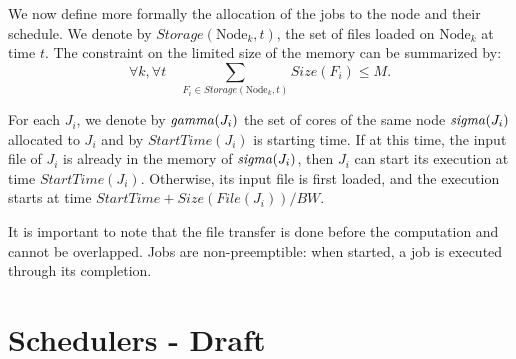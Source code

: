 \documentclass[conference,10pt]{IEEEtran}
\newcommand{\Node}[1]{\ensuremath{\mathrm{Node}_{#1}}\xspace}
\newcommand{\file}{\ensuremath{\mathit{File}}\xspace}
\newcommand{\storage}{\ensuremath{\mathit{Storage}}\xspace}
\newcommand{\size}{\ensuremath{\mathit{Size}}\xspace}
\newcommand{\bandwidth}{\mathit{BW}\xspace}
\newcommand{\walltime}{\mathit{WallTime}\xspace}
\newcommand{\start}{\mathit{StartTime}\xspace}
\newcommand{\allocatednode}{\ensuremath\mathit{sigma}\xspace}
\newcommand{\allocatedcores}{\ensuremath\mathit{gamma}\xspace}
\begin{document}
We now define more formally the allocation of the jobs to the node and
their schedule.
We denote by $\storage(\Node{k}, t)$, the set of files loaded on $\Node{k}$
at time $t$. The constraint on the limited size of the memory can be
summarized by:
$$
\forall k,\forall t \quad \sum_{F_i\in \storage(\Node{k},t)} \size(F_i)\leq M.
$$

For each $J_i$, we denote by
$\allocatedcores(J_i)$ the set of cores of the same node
$\allocatednode(J_i)$ allocated to $J_i$ and by
$\start(J_i)$ is starting time. If at this time, the input file of
$J_i$ is already in the memory of $\allocatednode(J_i)$, then $J_i$
can start its execution at time $\start(J_i)$. Otherwise, its input
file is first loaded, and the execution starts at time 
$\start+\size(\file(J_i))/\bandwidth$.


It is important to note that the file transfer is done before the computation and cannot be overlapped.
Jobs are non-preemptible: when started, a job is executed through its completion.


\section{Schedulers - Draft}\label{sec.schedulers}
\end{document}
